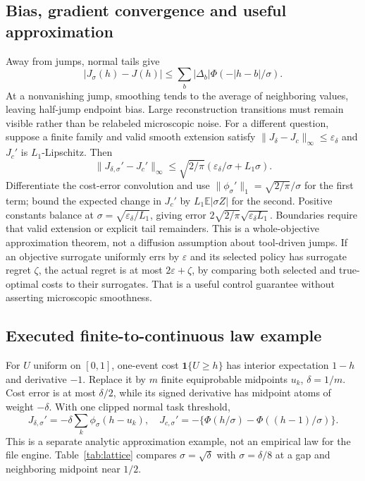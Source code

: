 \documentclass[sigconf,screen,nonacm]{acmart}
\newcommand{\E}{\mathbb{E}}
\newcommand{\ind}{\mathbf{1}}
\begin{document}
\subsection{Bias, gradient convergence and useful approximation}
Away from jumps, normal tails give
\begin{equation}
|J_\sigma(h)-J(h)|\le\sum_b|\Delta_b|\Phi(-|h-b|/\sigma).
\end{equation}
At a nonvanishing jump, smoothing tends to the average of neighboring
values, leaving half-jump endpoint bias. Large reconstruction transitions
must remain visible rather than be relabeled microscopic noise.
For a different question, suppose a finite family and valid smooth
extension satisfy $\|J_\delta-J_c\|_\infty\le\varepsilon_\delta$
and $J_c'$ is $L_1$-Lipschitz. Then
\begin{equation}
\|J_{\delta,\sigma}'-J_c'\|_\infty
\le\sqrt{2/\pi}(\varepsilon_\delta/\sigma+L_1\sigma).
\label{eq:continuum-bound}
\end{equation}
Differentiate the cost-error convolution and use
$\|\phi_\sigma'\|_1=\sqrt{2/\pi}/\sigma$ for the first term;
bound the expected change in $J_c'$ by $L_1\E|\sigma Z|$ for the
second. Positive constants balance at
$\sigma=\sqrt{\varepsilon_\delta/L_1}$, giving error
$2\sqrt{2/\pi}\sqrt{\varepsilon_\delta L_1}$.
Boundaries require that valid extension or explicit tail remainders.
This is a whole-objective approximation theorem, not a diffusion assumption
about tool-driven jumps. If an objective surrogate uniformly errs by
$\varepsilon$ and its selected policy has surrogate regret $\zeta$,
the actual regret is at most $2\varepsilon+\zeta$, by comparing both
selected and true-optimal costs to their surrogates. That is a useful
control guarantee without asserting microscopic smoothness.

\subsection{Executed finite-to-continuous law example}
For $U$ uniform on $[0,1]$, one-event cost $\ind\{U\ge h\}$ has
interior expectation $1-h$ and derivative $-1$. Replace it by $m$ finite
equiprobable midpoints $u_k$, $\delta=1/m$. Cost error is at most
$\delta/2$, while its signed derivative has midpoint atoms of weight
$-\delta$. With one clipped normal task threshold,
\begin{equation}
J_{\delta,\sigma}'=-\delta\sum_k\phi_\sigma(h-u_k),\quad
J_{c,\sigma}'=-\{\Phi(h/\sigma)-\Phi((h-1)/\sigma)\}.
\end{equation}
This is a separate analytic approximation example, not an empirical law
for the file engine. Table~\ref{tab:lattice} compares $\sigma=\sqrt\delta$
with $\sigma=\delta/8$ at a gap and neighboring midpoint near $1/2$.
\end{document}

